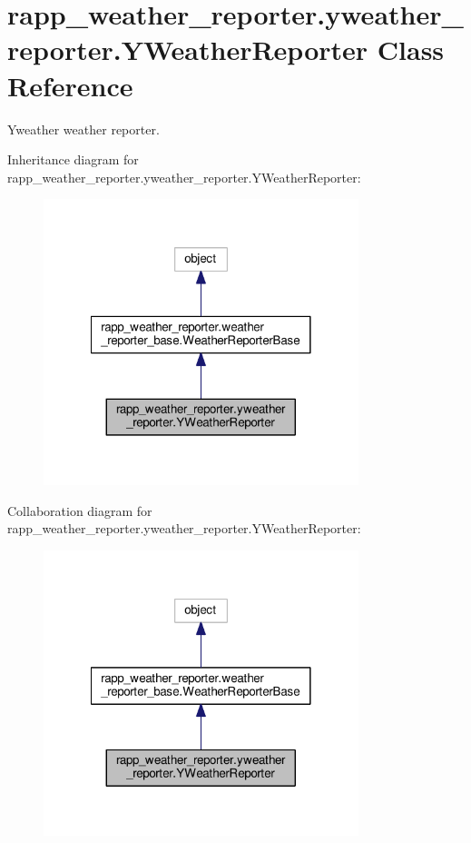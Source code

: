 \hypertarget{classrapp__weather__reporter_1_1yweather__reporter_1_1YWeatherReporter}{\section{rapp\-\_\-weather\-\_\-reporter.\-yweather\-\_\-reporter.\-Y\-Weather\-Reporter Class Reference}
\label{classrapp__weather__reporter_1_1yweather__reporter_1_1YWeatherReporter}
}


Yweather weather reporter.  




Inheritance diagram for rapp\-\_\-weather\-\_\-reporter.\-yweather\-\_\-reporter.\-Y\-Weather\-Reporter\-:
\nopagebreak
\begin{figure}[H]
\begin{center}
\leavevmode
\includegraphics[width=260pt]{classrapp__weather__reporter_1_1yweather__reporter_1_1YWeatherReporter__inherit__graph}
\end{center}
\end{figure}


Collaboration diagram for rapp\-\_\-weather\-\_\-reporter.\-yweather\-\_\-reporter.\-Y\-Weather\-Reporter\-:
\nopagebreak
\begin{figure}[H]
\begin{center}
\leavevmode
\includegraphics[width=260pt]{classrapp__weather__reporter_1_1yweather__reporter_1_1YWeatherReporter__coll__graph}
\end{center}
\end{figure}
